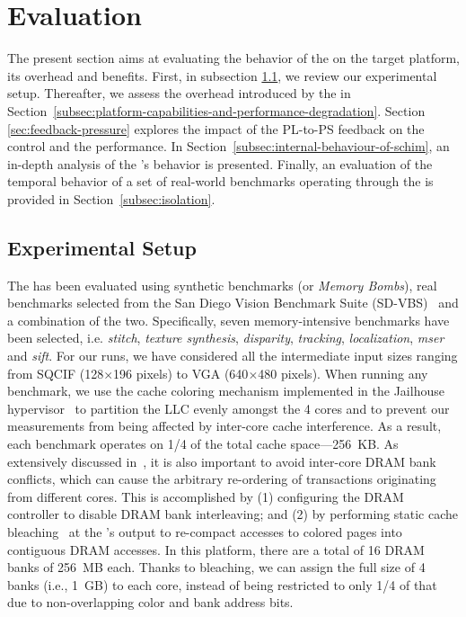 \section{Evaluation}

The present section aims at evaluating the behavior of the \schim on
the target platform, its overhead and benefits.  First, in subsection
\ref{subsection:considered-architecture}, we review our experimental
setup. Thereafter, we assess the overhead introduced by the \schim in
Section~\ref{subsec:platform-capabilities-and-performance-degradation}.
Section \ref{sec:feedback-pressure} explores the impact of the PL-to-PS feedback
on the control and the performance.
In Section~\ref{subsec:internal-behaviour-of-schim}, an in-depth analysis
of the \schim's behavior is presented. Finally, an evaluation of the
temporal behavior of a set of real-world benchmarks operating through
the \schim is provided in Section~\ref{subsec:isolation}.


\subsection{Experimental Setup}
\label{subsection:considered-architecture}
The \schim has been evaluated using synthetic benchmarks (or
\emph{Memory Bombs}), real benchmarks selected from the San Diego
Vision Benchmark Suite (SD-VBS)~\cite{SD-VBS} and a combination of
the two. Specifically, seven memory-intensive benchmarks have
been selected, i.e. \emph{stitch}, \emph{texture synthesis},
\emph{disparity}, \emph{tracking}, \emph{localization}, \emph{mser}
and \emph{sift}. For our runs, we have considered all the intermediate
input sizes ranging from SQCIF (128$\times$196 pixels) to VGA
(640$\times$480 pixels). When running any benchmark, we use the cache
coloring mechanism implemented in the Jailhouse
hypervisor~\cite{determ_virt} to partition the LLC evenly amongst the
4 cores and to prevent our measurements from being affected by inter-core
cache interference. As a result, each benchmark operates on 1/4 of the
total cache space---256~KB. As extensively discussed
in~\cite{bounding_rtas14, palloc_rtas14}, it is also important to
avoid inter-core DRAM bank conflicts, which can cause the arbitrary
re-ordering of transactions originating from different cores. This is
accomplished by (1) configuring the DRAM controller to disable DRAM
bank interleaving; and (2) by performing static cache
bleaching~\cite{gracioli2019designing, PLIM20} at the \schim's output
to re-compact accesses to colored pages into contiguous DRAM
accesses. In this platform, there are a total of 16 DRAM banks of
256~MB each. Thanks to bleaching, we can assign the full size
of 4 banks (i.e., 1~GB) to each core, instead of being restricted
to only 1/4 of that due to non-overlapping color and bank address
bits.

